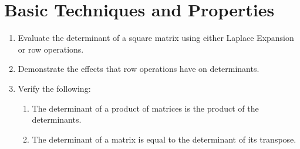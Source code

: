 \section{Basic Techniques and Properties}

\begin{outcome}

\begin{enumerate}
\item[A.] Evaluate the determinant of a square matrix using either Laplace Expansion or row operations.

\item[B.] Demonstrate the effects that row operations have on determinants.

\item[C.] Verify the following:

\begin{enumerate}
\item The determinant of a product of matrices is the product of the
determinants.

\item The determinant of a matrix is equal to the determinant of its
transpose.
\end{enumerate}

\end{enumerate}
\end{outcome}